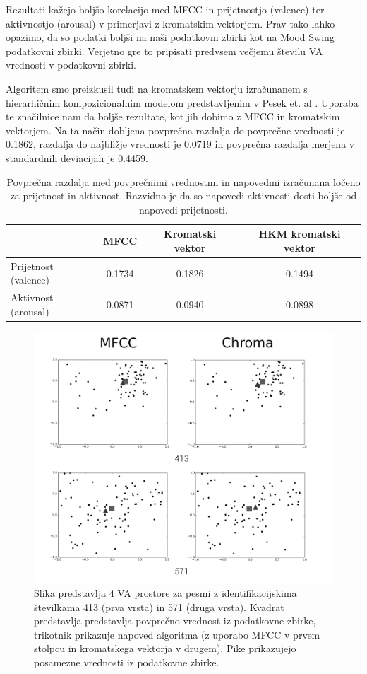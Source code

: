 \documentclass[a4paper, 12pt]{book}
\begin{document}
{Rezultati kažejo boljšo korelacijo med MFCC in prijetnostjo (valence) ter aktivnostjo (arousal) v primerjavi z kromatskim vektorjem. Prav tako lahko opazimo, da so podatki boljši na naši podatkovni zbirki kot na Mood Swing podatkovni zbirki. Verjetno gre to pripisati predvsem večjemu številu VA vrednosti v podatkovni zbirki. 

Algoritem smo preizkusil tudi na kromatskem vektorju izračunanem s hierarhičnim kompozicionalnim modelom predstavljenim v Pesek et. al \cite{Pesek2013}. Uporaba te značilnice nam da boljše rezultate, kot jih dobimo z MFCC in kromatskim vektorjem. Na ta način dobljena povprečna razdalja do povprečne vrednosti je 0.1862, razdalja do najbližje vrednosti je 0.0719 in povprečna razdalja merjena v standardnih deviacijah je 0.4459. 

\begin{table}[htb]
\begin{center}
\caption{Povprečna razdalja med povprečnimi vrednostmi in napovedmi izračunana ločeno za prijetnost in aktivnost. Razvidno je da so napovedi aktivnosti dosti boljše od napovedi prijetnosti. }
\begin{tabular}{|l|c|c|c|}
\hline
 & MFCC & Kromatski vektor & HKM kromatski vektor \\
\hline
Prijetnost (valence) & 0.1734 & 0.1826 & 0.1494\\
Aktivnost (arousal) & 0.0871 & 0.0940 & 0.0898\\
\hline
\end{tabular}
\label{seperateresults}
\end{center}
\end{table}

\begin{figure}[h!bt]
\centering
\includegraphics[width=130mm]{images/graphs1.png}
\caption{Slika predstavlja 4 VA prostore za pesmi z identifikacijskima številkama 413 (prva vrsta) in 571 (druga vrsta). Kvadrat predstavlja predstavlja povprečno vrednost iz podatkovne zbirke, trikotnik prikazuje napoved algoritma (z uporabo MFCC v prvem stolpcu in kromatskega vektorja v drugem). Pike prikazujejo posamezne vrednosti iz podatkovne zbirke.}
\label{graphs}
\end{figure}

}
\end{document}
